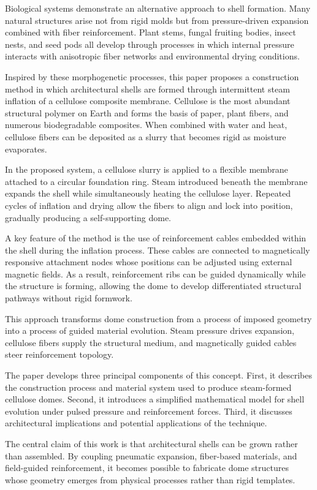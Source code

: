 \documentclass[12pt,a4paper]{article}
\begin{document}
Biological systems demonstrate an alternative approach to shell
formation. Many natural structures arise not from rigid molds but from
pressure-driven expansion combined with fiber reinforcement. Plant
stems, fungal fruiting bodies, insect nests, and seed pods all develop
through processes in which internal pressure interacts with anisotropic
fiber networks and environmental drying conditions.

Inspired by these morphogenetic processes, this paper proposes a
construction method in which architectural shells are formed through
intermittent steam inflation of a cellulose composite membrane.
Cellulose is the most abundant structural polymer on Earth and forms
the basis of paper, plant fibers, and numerous biodegradable composites.
When combined with water and heat, cellulose fibers can be deposited as
a slurry that becomes rigid as moisture evaporates.

In the proposed system, a cellulose slurry is applied to a flexible
membrane attached to a circular foundation ring. Steam introduced
beneath the membrane expands the shell while simultaneously heating the
cellulose layer. Repeated cycles of inflation and drying allow the
fibers to align and lock into position, gradually producing a
self-supporting dome.

A key feature of the method is the use of reinforcement cables embedded
within the shell during the inflation process. These cables are connected
to magnetically responsive attachment nodes whose positions can be
adjusted using external magnetic fields. As a result, reinforcement ribs
can be guided dynamically while the structure is forming, allowing the
dome to develop differentiated structural pathways without rigid
formwork.

This approach transforms dome construction from a process of imposed
geometry into a process of guided material evolution. Steam pressure
drives expansion, cellulose fibers supply the structural medium, and
magnetically guided cables steer reinforcement topology.

The paper develops three principal components of this concept. First, it
describes the construction process and material system used to produce
steam-formed cellulose domes. Second, it introduces a simplified
mathematical model for shell evolution under pulsed pressure and
reinforcement forces. Third, it discusses architectural implications and
potential applications of the technique.

The central claim of this work is that architectural shells can be grown
rather than assembled. By coupling pneumatic expansion, fiber-based
materials, and field-guided reinforcement, it becomes possible to
fabricate dome structures whose geometry emerges from physical processes
rather than rigid templates.
\end{document}
